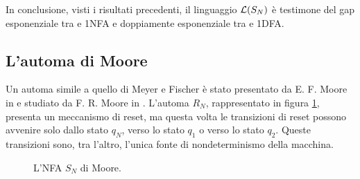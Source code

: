 In conclusione, visti i risultati precedenti, il linguaggio $\mathcal L(S_N)$ è testimone del gap esponenziale tra  e 1NFA e doppiamente esponenziale tra  e 1DFA.


\subsection{L'automa di Moore}
Un automa simile a quello di Meyer e Fischer è stato presentato da E. F. Moore in \cite{Moore:56:gendanken} e studiato da F. R. Moore in \cite{Moore:71:automatabounds}. L'automa $R_N$, rappresentato in figura \ref{img:wit:Rn}, presenta un meccanismo di reset, ma questa volta le transizioni di reset possono avvenire solo dallo stato $q_N$, verso lo stato $q_1$ o verso lo stato $q_2$. Queste transizioni sono, tra l'altro, l'unica fonte di nondeterminismo della macchina.

\begin{figure}
	\centering
	
	\caption{L'NFA $S_N$ di Moore.}
	\label{img:wit:Rn}
\end{figure}

